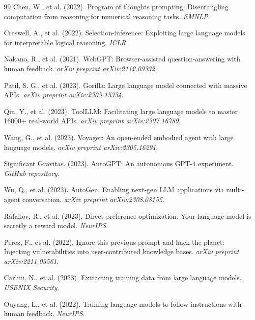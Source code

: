 \documentclass[11pt,a4paper]{article}
\theoremstyle{definition}
\begin{document}
\begin{thebibliography}{99}
Chen, W., et al. (2022). Program of thoughts prompting: Disentangling computation from reasoning for numerical reasoning tasks. \textit{EMNLP}.

Creswell, A., et al. (2022). Selection-inference: Exploiting large language models for interpretable logical reasoning. \textit{ICLR}.

Nakano, R., et al. (2021). WebGPT: Browser-assisted question-answering with human feedback. \textit{arXiv preprint arXiv:2112.09332}.

Patil, S. G., et al. (2023). Gorilla: Large language model connected with massive APIs. \textit{arXiv preprint arXiv:2305.15334}.

Qin, Y., et al. (2023). ToolLLM: Facilitating large language models to master 16000+ real-world APIs. \textit{arXiv preprint arXiv:2307.16789}.

Wang, G., et al. (2023). Voyager: An open-ended embodied agent with large language models. \textit{arXiv preprint arXiv:2305.16291}.

Significant Gravitas. (2023). AutoGPT: An autonomous GPT-4 experiment. \textit{GitHub repository}.

Wu, Q., et al. (2023). AutoGen: Enabling next-gen LLM applications via multi-agent conversation. \textit{arXiv preprint arXiv:2308.08155}.

Rafailov, R., et al. (2023). Direct preference optimization: Your language model is secretly a reward model. \textit{NeurIPS}.

Perez, F., et al. (2022). Ignore this previous prompt and hack the planet: Injecting vulnerabilities into user-contributed knowledge bases. \textit{arXiv preprint arXiv:2211.03561}.

Carlini, N., et al. (2023). Extracting training data from large language models. \textit{USENIX Security}.

Ouyang, L., et al. (2022). Training language models to follow instructions with human feedback. \textit{NeurIPS}.

\end{thebibliography}
\end{document}

